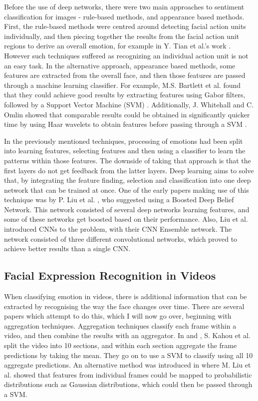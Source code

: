 \documentclass[sigconf]{acmart}
\begin{document}
{Before the use of deep networks, there were two main approaches to sentiment
classification for images - rule-based methods, and appearance based methods.
First, the rule-based methods were centred around detecting facial action
units individually, and then piecing together the results from the facial
action unit regions to derive an overall emotion, for example in Y. Tian
et al.'s work \cite{tian2001recognizing}. However such techniques
suffered as recognizing an individual action unit is not an easy task. In the
alternative approach, appearance based methods, some features are extracted
from the overall face, and then those features are passed through a machine
learning classifier. For example, M.S. Bartlett et al. found that they could
achieve good results by extracting features using Gabor filters, followed by a
Support Vector Machine (SVM) \cite{bartlett2005recognizing}. Additionally, J.
Whitehall and C. Omlin showed that comparable results could be obtained in
significantly quicker time by using Haar wavelets to obtain features
before passing through a SVM \cite{whitehill2006haar}. 

In the previously mentioned techniques, processing of emotions had been split into learning
features, selecting features and then using a classifier to learn the
patterns within those features. The downside of taking that approach is that the first layers do not
get feedback from the latter layers. Deep learning aims to solve that, by
integrating the feature finding, selection and classification into one deep
network that can be trained at once. One of the early papers making use of
this technique was by P. Liu et al. \cite{liu2014facial}, who suggested using
a Boosted Deep Belief Network. This network consisted of several deep networks
learning features, and some of these networks get boosted based on their
performance. Also,  Liu et al. introduced CNNs to the 
problem, with their CNN Ensemble network\cite{liu2016facial}. The network consisted of three 
different convolutional networks, which proved to achieve better results than
a single CNN.

\subsection{Facial Expression Recognition in Videos}

When classifying emotion in videos, there is additional information that can
be extracted by recognising the way the face changes over time. There are
several papers which attempt to do this, which I will now go over, beginning
with aggregation techniques. Aggregation techniques classify each frame within
a video, and then combine the results with an aggregator. In
\cite{kahou2016emonets} and \cite{kahou2013combining}, S. Kahou et al. split
the video into 10 sections, and within each section aggregate the frame
predictions by taking the mean. They go on to use a SVM to classify using all 10
aggregate predictions. An alternative method was introduced in 
\cite{liu2014combining} where
M. Liu et al. showed that features from individual frames could be mapped to 
probabilistic distributions such as Gaussian distributions, which could then
be passed through a SVM.

}
\end{document}
